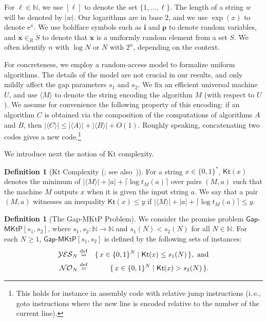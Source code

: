 \documentclass[11pt]{article}
\numberwithin{equation}{section}
\theoremstyle{definition}
\newtheorem{definition}[theorem]{Definition}
\theoremstyle{plain}
\newcommand{\eee}{\mathrm e}
\newcommand{\ie}{i.\,e.}
\newcommand{\eqdef}{\stackrel{\rm def}{=}}
\newcommand{\gapmktp}{\mathsf{Gap}$-$\mathsf{MKtP}}
\newcommand{\Kt}{\mathsf{Kt}}
\begin{document}
For $\ell \in \mathbb{N}$, we use $[\ell]$ to denote the set $\{1, \ldots, \ell\}$. The length of a string $w$ will be denoted by $|w|$. Our logarithms are in base $2$, and we use $\exp(x)$ to denote $\eee^x$. We use boldface symbols such as ${\bm i}$ and ${\bm \rho}$ to denote random variables, and ${\bm x} \in_R S$ to denote that ${\bm x}$ is a uniformly random element from a set $S$. We often identify $n$ with $\log N$ or $N$ with $2^n$, depending on the context.

\vspace{0.2cm}

For concreteness, we employ a random-access model to formalize uniform algorithms. The details of the model are not crucial in our results, and only mildly affect the gap parameters $s_1$ and $s_2$. We fix an efficient universal machine $U$, and use $\langle M \rangle$ to denote the string encoding the algorithm $M$ (with respect to $U$). We assume for convenience the following property of this encoding: if an algorithm $C$ is obtained via the composition of the computations of algorithms $A$ and $B$, then $| \langle C \rangle | \leq |\langle A \rangle| + |\langle B \rangle| + O(1)$. Roughly speaking, concatenating two codes gives a new code.\footnote{This holds for instance in assembly code with relative jump instructions (\ie, goto instructions where the new line is encoded relative to the number of the current line).}

We introduce next the notion of Kt complexity. 



\begin{definition}[Kt Complexity (\cite{Levin84}; see also~\cite{Allender01})] \label{d:kt} For a string $x \in \{0,1\}^*$, $\Kt(x)$ denotes the minimum of $|\langle M \rangle| + |a| + \lceil \log t_M(a) \rceil$ over pairs $(M,a)$ such that the machine $M$ outputs $x$ when it is given the input string $a$. We say that a pair $(M,a)$ witnesses an inequality $\Kt(x)\le y$ if $|\langle M \rangle| + |a| + \lceil \log t_M(a) \rceil\le y$.
\end{definition}



\begin{definition}[The Gap-MKtP Problem] \label{d:gapmktp} We consider the promise problem $\gapmktp[s_1,s_2]$, where $s_1,s_2 \colon \mathbb{N} \to \mathbb{N}$ and $s_1(N) < s_2(N)$ for all $N \in \mathbb{N}$. For each $N \geq 1$, $\gapmktp[s_1,s_2]$ is defined by the following sets of instances:
\begin{eqnarray}
\mathcal{YES}_N & \eqdef & \{\,x \in \{0,1\}^N \mid \Kt(x) \leq s_1(N)\,\},~\text{and} \nonumber \\
\mathcal{NO}_N & \eqdef & \{\,x \in \{0,1\}^N \mid \Kt(x) > s_2(N)\,\}. \nonumber
\end{eqnarray}
\end{definition}
\end{document}
